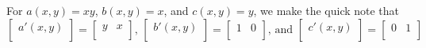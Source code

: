 \documentclass{article}
\theoremstyle{plain} %
\numberwithin{thm}{section} %
\theoremstyle{definition}
\begin{document}
\begin{question}{29}
        For \(a(x,y) = xy\), \(b(x,y) = x\), and \(c(x,y) = y\), we make the quick note that
        \[
            \begin{bmatrix}
                 a'(x,y) \\
            \end{bmatrix}
            =
            \begin{bmatrix}
                y &  x \\
            \end{bmatrix}
            \text{, } 
            \begin{bmatrix}
                 b'(x,y) \\
            \end{bmatrix}
            =
            \begin{bmatrix}
                1 &  0 \\
            \end{bmatrix}
            \text{, and } 
            \begin{bmatrix}
                 c'(x,y) \\
            \end{bmatrix}
            =
            \begin{bmatrix}
                0 &  1 \\
            \end{bmatrix}
        \]


\end{question}
\end{document}
